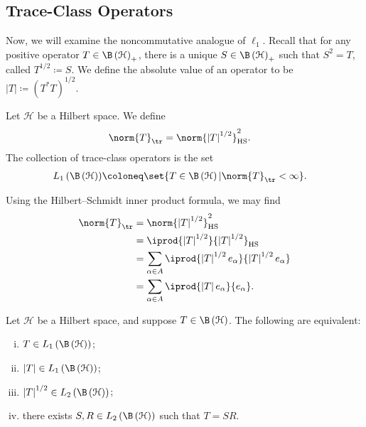 \documentclass[10pt]{mypackage}
\DeclareMathOperator{\hs}{HS}
\begin{document}
\subsection{Trace-Class Operators}%
Now, we will examine the noncommutative analogue of $\ell_1$. Recall that for any positive operator $T\in \B\left( \mathcal{H} \right)_{+}$, there is a unique $S\in \B\left( \mathcal{H} \right)_{+}$ such that $S^2 = T$, called $T^{1/2}\coloneq S$. We define the absolute value of an operator to be $\left\vert T \right\vert\coloneq \left( T^{\ast}T \right)^{1/2}$.
\begin{definition}
  Let $\mathcal{H}$ be a Hilbert space. We define
  \begin{align*}
    \norm{T}_{\tr} &= \norm{\left\vert T \right\vert^{1/2}}_{\hs}^2.
  \end{align*}
  The collection of trace-class operators is the set
  \begin{align*}
    L_1\left( \B\left( \mathcal{H} \right) \right) &\coloneq \set{T\in \B\left( \mathcal{H} \right) | \norm{T}_{\tr} < \infty}.
  \end{align*}
\end{definition}
Using the Hilbert--Schmidt inner product formula, we may find
\begin{align*}
  \norm{T}_{\tr} &= \norm{\left\vert T \right\vert^{1/2}}_{\hs}^2\\
                 &= \iprod{\left\vert T \right\vert^{1/2}}{\left\vert T \right\vert^{1/2}}_{\hs}\\
                 &= \sum_{\alpha \in A} \iprod{\left\vert T \right\vert^{1/2}e_{\alpha}}{\left\vert T \right\vert^{1/2}e_{\alpha}}\\
                 &= \sum_{\alpha \in A} \iprod{\left\vert T \right\vert e_{\alpha}}{e_{\alpha}}.
\end{align*}
\begin{lemma}
  Let $\mathcal{H}$ be a Hilbert space, and suppose $T\in \B\left( \mathcal{H} \right)$. The following are equivalent:
  \begin{enumerate}[(i)]
    \item $T\in L_1\left( \B\left( \mathcal{H} \right) \right)$;
    \item $\left\vert T \right\vert\in L_1\left( \B\left( \mathcal{H} \right) \right)$;
    \item $\left\vert T \right\vert^{1/2}\in L_2\left( \B\left( \mathcal{H} \right) \right)$;
    \item there exists $S,R\in L_2\left( \B\left( \mathcal{H} \right) \right)$ such that $T = SR$.
  \end{enumerate}
\end{lemma}
\end{document}
